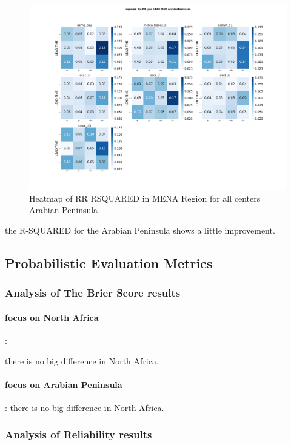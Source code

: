 \begin{figure}[H]
\includegraphics[scale=0.3]{plots/det/rsquared/rsquared_RR_ArabianPeninsula.png}
\caption{Heatmap of RR  RSQUARED in MENA Region for all centers Arabian Peninsula}
\end{figure}

the R-SQUARED for the Arabian Peninsula shows a little improvement.

\subsection{Probabilistic Evaluation Metrics}

\subsubsection{Analysis of The Brier Score results}

\paragraph{focus on North Africa}:

there is no big difference in North Africa.
\vspace{1.5cm}
\paragraph{focus on Arabian Peninsula}:
there is no big difference in North Africa.

\subsubsection{ Analysis of Reliability results}
